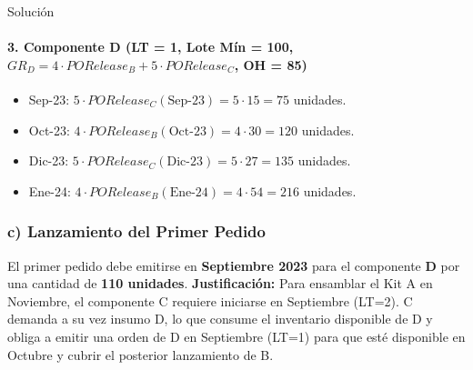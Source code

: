 \documentclass[11pt, a4paper]{article}
\begin{document}
\begin{ejercicio}{Solución}
  \paragraph{3. Componente D (LT = 1, Lote Mín = 100, $GR_D = 4 \cdot PORelease_B + 5 \cdot PORelease_C$, OH = 85)}
  \begin{itemize}
    \item Sep-23: $5 \cdot PORelease_C(\text{Sep-23}) = 5 \cdot 15 = 75$ unidades.
    \item Oct-23: $4 \cdot PORelease_B(\text{Oct-23}) = 4 \cdot 30 = 120$ unidades.
    \item Dic-23: $5 \cdot PORelease_C(\text{Dic-23}) = 5 \cdot 27 = 135$ unidades.
    \item Ene-24: $4 \cdot PORelease_B(\text{Ene-24}) = 4 \cdot 54 = 216$ unidades.
  \end{itemize}
  \begin{center}
  \end{center}

  \subsubsection*{c) Lanzamiento del Primer Pedido}
  El primer pedido debe emitirse en \textbf{Septiembre 2023} para el componente \textbf{D} por una cantidad de \textbf{110 unidades}.
  \textbf{Justificación:} Para ensamblar el Kit A en Noviembre, el componente C requiere iniciarse en Septiembre (LT=2). C demanda a su vez insumo D, lo que consume el inventario disponible de D y obliga a emitir una orden de D en Septiembre (LT=1) para que esté disponible en Octubre y cubrir el posterior lanzamiento de B.

\end{ejercicio}
\end{document}
